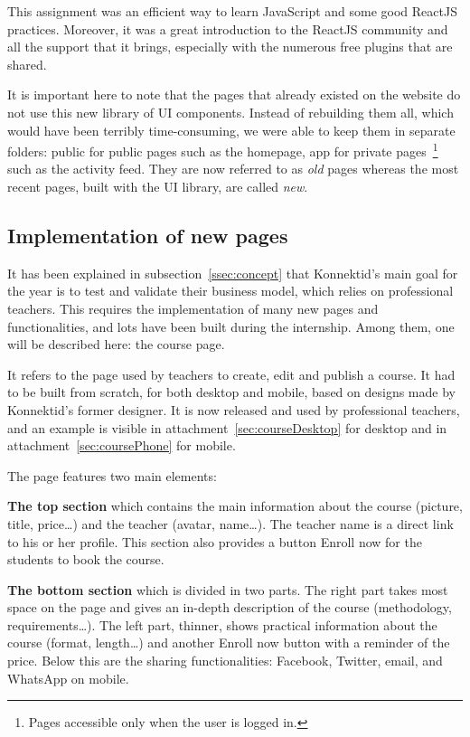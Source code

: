 This assignment was an efficient way to learn JavaScript and some good ReactJS practices. Moreover, it was a great introduction to the ReactJS community and all the support that it brings, especially with the numerous free plugins that are shared.

It is important here to note that the pages that already existed on the website do not use this new library of UI components. Instead of rebuilding them all, which would have been terribly time-consuming, we were able to keep them in separate folders: \guillemotleft{} public \guillemotright{} for public pages such as the homepage, \guillemotleft{} app \guillemotright{} for private pages~\footnote{Pages accessible only when the user is logged in.} such as the activity feed. They are now referred to as \textit{old} pages whereas the most recent pages, built with the UI library, are called \textit{new}.

\subsection{Implementation of new pages}
\label{ssec:new_pages}

It has been explained in {\sc subsection}~\ref{ssec:concept} that Konnektid's main goal for the year is to test and validate their business model, which relies on
professional teachers. This requires the implementation of many new pages and functionalities, and lots have been built during the internship. Among them, one will be described here: the course page.

It refers to the page used by teachers to create, edit and publish a course. It had to be built from scratch, for both desktop and mobile, based on designs made by Konnektid's former designer. It is now released and used by professional teachers, and an example is visible in {\sc attachment}~\ref{sec:courseDesktop} for desktop and in {\sc attachment}~\ref{sec:coursePhone} for mobile.

The page features two main elements:

\textbf{The top section} which contains the main information about the course (picture, title, price\ldots) and the teacher (avatar, name\ldots).
The teacher name is a direct link to his or her profile. This section also provides a button \guillemotleft{} Enroll now \guillemotright{} for the students to book the course.

\textbf{The bottom section} which is divided in two parts. The right part takes most space on the page and gives an in-depth description of the course
(methodology, requirements\ldots). The left part, thinner, shows practical information about the course (format, length\ldots) and another \guillemotleft{} Enroll now \guillemotright{} button with a reminder of the price. Below this are the sharing functionalities: Facebook, Twitter,
email, and WhatsApp on mobile.

